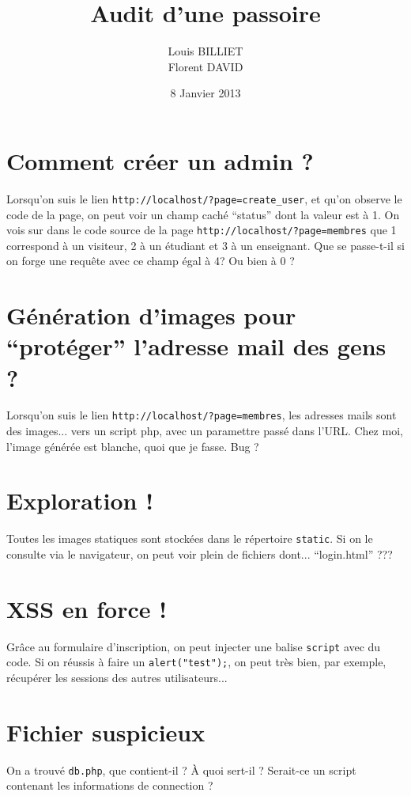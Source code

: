 \documentclass[oneside,10pt]{article}
\begin{document}
\title{Audit d'une passoire}
\author{Louis BILLIET \\ Florent DAVID}
\date{8 Janvier 2013}
\maketitle

\section{Comment cr\'eer un admin ?}
Lorsqu'on suis le lien \verb+http://localhost/?page=create_user+, et qu'on observe le code de la page, on peut voir un champ cach\'e ``status'' dont la valeur est \`a 1.
On vois sur dans le code source de la page \verb+http://localhost/?page=membres+ que 1 correspond \`a un visiteur, 2 \`a un \'etudiant et 3 \`a un enseignant.
Que se passe-t-il si on forge une requ\^ete avec ce champ \'egal \`a 4? Ou bien \`a 0 ?

\section{G\'en\'eration d'images pour ``prot\'eger'' l'adresse mail des gens ?}
Lorsqu'on suis le lien \verb+http://localhost/?page=membres+, les adresses mails sont des images... vers un script php, avec un paramettre pass\'e dans l'URL.
Chez moi, l'image g\'en\'er\'ee est blanche, quoi que je fasse. Bug ?

\section{Exploration !}
Toutes les images statiques sont stock\'ees dans le r\'epertoire \verb+static+.
Si on le consulte via le navigateur, on peut voir plein de fichiers dont... ``login.html'' ???

\section{XSS en force !}
Gr\^ace au formulaire d'inscription, on peut injecter une balise \verb+script+ avec du code.
Si on r\'eussis \`a faire un \verb+alert("test");+, on peut tr\`es bien, par exemple, r\'ecup\'erer les sessions des autres utilisateurs...

\section{Fichier suspicieux}
On a trouv\'e \verb+db.php+, que contient-il ?
\`A quoi sert-il ?
Serait-ce un script contenant les informations de connection ?
\end{document}

